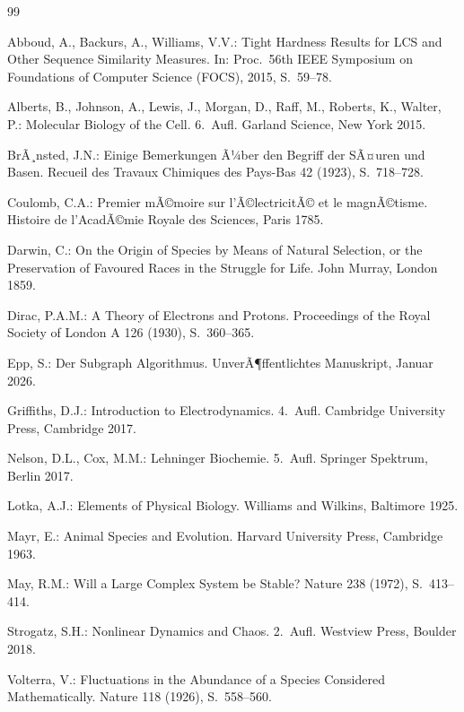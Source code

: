 ﻿\documentclass[a4paper,12pt]{article}
\theoremstyle{definition}
\begin{document}
\begin{thebibliography}{99}

Abboud, A., Backurs, A., Williams, V.V.:
Tight Hardness Results for LCS and Other Sequence Similarity Measures.
In: Proc.\ 56th IEEE Symposium on Foundations of Computer Science (FOCS), 2015, S.~59--78.

Alberts, B., Johnson, A., Lewis, J., Morgan, D., Raff, M., Roberts, K., Walter, P.:
Molecular Biology of the Cell. 6.~Aufl.
Garland Science, New York 2015.

BrÃ¸nsted, J.N.:
Einige Bemerkungen Ã¼ber den Begriff der SÃ¤uren und Basen.
Recueil des Travaux Chimiques des Pays-Bas 42 (1923), S.~718--728.

Coulomb, C.A.:
Premier mÃ©moire sur l'Ã©lectricitÃ© et le magnÃ©tisme.
Histoire de l'AcadÃ©mie Royale des Sciences, Paris 1785.

Darwin, C.:
On the Origin of Species by Means of Natural Selection, or the Preservation of
Favoured Races in the Struggle for Life.
John Murray, London 1859.

Dirac, P.A.M.:
A Theory of Electrons and Protons.
Proceedings of the Royal Society of London A 126 (1930), S.~360--365.

Epp, S.:
Der Subgraph Algorithmus.
UnverÃ¶ffentlichtes Manuskript, Januar 2026.

Griffiths, D.J.:
Introduction to Electrodynamics. 4.~Aufl.
Cambridge University Press, Cambridge 2017.

Nelson, D.L., Cox, M.M.:
Lehninger Biochemie. 5.~Aufl.
Springer Spektrum, Berlin 2017.

Lotka, A.J.:
Elements of Physical Biology.
Williams and Wilkins, Baltimore 1925.

Mayr, E.:
Animal Species and Evolution.
Harvard University Press, Cambridge 1963.

May, R.M.:
Will a Large Complex System be Stable?
Nature 238 (1972), S.~413--414.

Strogatz, S.H.:
Nonlinear Dynamics and Chaos. 2.~Aufl.
Westview Press, Boulder 2018.

Volterra, V.:
Fluctuations in the Abundance of a Species Considered Mathematically.
Nature 118 (1926), S.~558--560.


\end{thebibliography}
\end{document}
